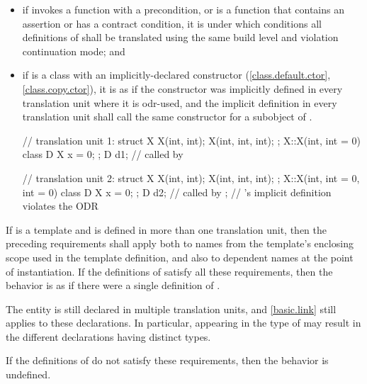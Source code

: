 \begin{itemize}
\item if  invokes a function with a precondition,
or is a function
that contains an assertion or has a contract condition,
it is 
under which conditions all definitions of 
shall be translated using the same build level
and violation continuation mode; and

\item if  is a class with an implicitly-declared
constructor (\ref{class.default.ctor}, \ref{class.copy.ctor}),
it is as if the constructor was
implicitly defined in every translation unit where it is odr-used, and the
implicit definition in every translation unit shall call the same
constructor for a subobject of .
\begin{example}

\begin{codeblock}
// translation unit 1:
struct X {
  X(int, int);
  X(int, int, int);
};
X::X(int, int = 0) { }
class D {
  X x = 0;
};
D d1;                           //  called by 

// translation unit 2:
struct X {
  X(int, int);
  X(int, int, int);
};
X::X(int, int = 0, int = 0) { }
class D {
  X x = 0;
};
D d2;                           //  called by ;
                                // 's implicit definition violates the ODR
\end{codeblock}
\end{example}
\end{itemize}
If  is a template and is defined in more than one
translation unit, then the preceding requirements
shall apply both to names from the template's enclosing scope used in the
template definition, and also to dependent names at
the point of instantiation. If the definitions of
 satisfy all these requirements, then the behavior is
as if there were a single definition of .
\begin{note}
The entity is still declared in multiple translation units, and \ref{basic.link}
still applies to these declarations. In particular,
appearing in the type of  may result
in the different declarations having distinct types.
\end{note}
If the definitions of
 do not satisfy these requirements, then the behavior is
undefined.%

